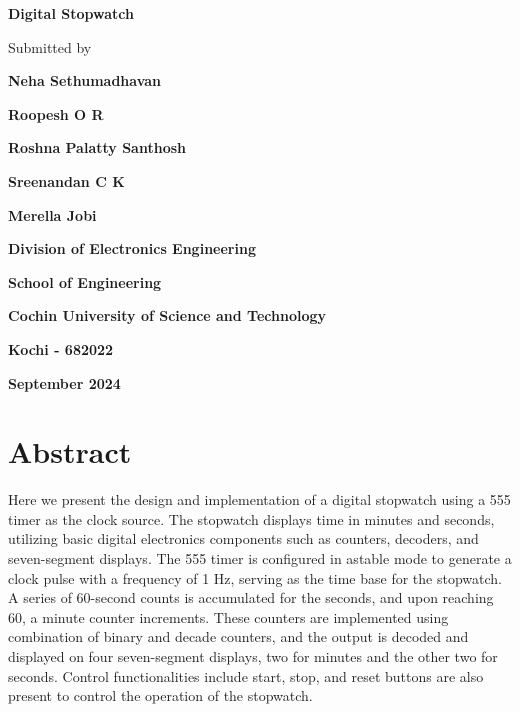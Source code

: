 \documentclass[12pt, a4paper]{article}
\newcommand{\usection}[1]{
	\section*{\center \Huge #1}
	\addcontentsline{toc}{section}{\protect\numberline{}#1}
}
\begin{document}
\begin{titlepage}
	\centering

	{\huge \textbf{Digital Stopwatch} \par}

	\vspace{1.5cm}

	{\large Submitted by \par}

	\vspace{.5cm}

	{\large \textbf{Neha Sethumadhavan}\par}
	{\large \textbf{Roopesh O R}\par}
	{\large \textbf{Roshna Palatty Santhosh}\par}
	{\large \textbf{Sreenandan C K}\par}
	{\large \textbf{Merella Jobi}\par}

	\vspace{2cm}

 	\par

	\vspace{.1cm}

	{\textbf{Division of Electronics Engineering} \par}
	{\textbf{School of Engineering} \par}
	{\textbf{Cochin University of Science and Technology} \par}
	{\textbf{Kochi - 682022} \par}

	\vspace{.5cm}

	{\textbf{September 2024} \par}

	\vfill

\end{titlepage}
\setlength{\parskip}{5pt}%
\vspace*{4cm}
\thispagestyle{empty}
\addtocounter{page}{-1}
\usection{Abstract}
\vspace{.5cm}
Here we present the design and implementation of a digital stopwatch using a 555 timer as the clock source. The stopwatch displays time in minutes and seconds, utilizing basic digital electronics components such as counters, decoders, and seven-segment displays. The 555 timer is configured in astable mode to generate a clock pulse with a frequency of 1 Hz, serving as the time base for the stopwatch. A series of 60-second counts is accumulated for the seconds, and upon reaching 60, a minute counter increments. These counters are implemented using combination of binary and decade counters, and the output is decoded and displayed on four seven-segment displays, two for minutes and the other two for seconds.
Control functionalities include start, stop, and reset buttons are also present to control the operation of the stopwatch.
\end{document}
